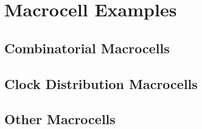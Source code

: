 \part{Macrocell Examples}
\pagestyle{headings}


\chapter{Combinatorial Macrocells}




\chapter{Clock Distribution Macrocells}




\chapter{Other Macrocells}


